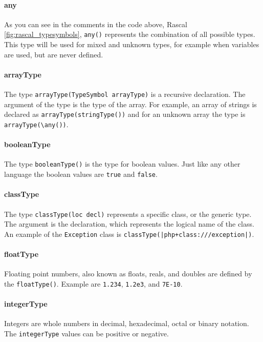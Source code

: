 \documentclass[../main.tex]{subfiles}
\begin{document}
    \paragraph{any} 
    As you can see in the comments in the code above, Rascal \ref{fig:rascal_typesymbols}, \texttt{any()} represents the combination of all possible types. 
    This type will be used for mixed and unknown types, for example when variables are used, but are never defined.
    
    \paragraph{arrayType}
    The type \texttt{arrayType(TypeSymbol arrayType)} is a recursive declaration.
    The argument of the type is the type of the array. 
    For example, an array of strings is declared as \texttt{arrayType(stringType())} and for an unknown array the type is \texttt{arrayType(\textbackslash{}any())}.
    
    \paragraph{booleanType}
    The type \texttt{booleanType()} is the type for boolean values.
    Just like any other language the boolean values are \texttt{true} and \texttt{false}.
    
    \paragraph{classType}
    The type \texttt{classType(loc decl)} represents a specific class, or the generic type.
    The argument is the declaration, which represents the logical name of the class. 
    An example of the \texttt{Exception} class is \texttt{classType(|php+class:///exception|)}.
    
    \paragraph{floatType}
    Floating point numbers, also known as floats, reals, and doubles are defined by the \texttt{floatType()}.
    Example are \texttt{1.234}, \texttt{1.2e3}, and \texttt{7E-10}.
    
    \paragraph{integerType}
    Integers are whole numbers in decimal, hexadecimal, octal or binary notation.
    The \texttt{integerType} values can be positive or negative.
    
\end{document}
